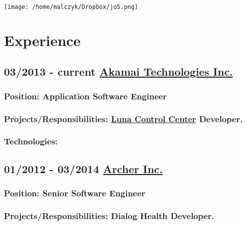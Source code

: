 \documentclass[a4paper]{article}
\begin{document}
	\texttt{[image: /home/malczyk/Dropbox/jo5.png]} 

\section*{\LARGE{Experience}} 

\subsection*{03/2013 - current \href{http://akamai.com}{Akamai Technologies Inc.}}
\subsubsection*{Position:  \textcolor[RGB]{140,140,140}{Application Software Engineer}}
\subsubsection*{Projects/Responsibilities: \href{http://www.akamai.com/html/technology/luna-control-center.html}{Luna Control Center} Developer.}



\subsubsection*{Technologies:}


\subsection*{01/2012 - 03/2014 \href{http://archermobile.com}{Archer Inc.}}

\subsubsection*{Position:  \textcolor[RGB]{140,140,140} { Senior Software Engineer} }

\subsubsection*{Projects/Responsibilities: Dialog Health Developer.} 
\end{document}
